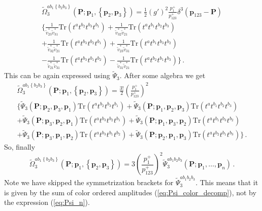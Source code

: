 \documentclass[english,american]{article}
\begin{document}
\begin{multline}
\tilde{\Omega}_{3}^{ab_{1}\left\{ b_{2}b_{3}\right\} }\left(\mathbf{P};\mathbf{p}_{1},\left\{ \mathbf{p}_{2},\mathbf{p}_{3}\right\} \right)=\frac{1}{2}\left(g'\right)^{2}\frac{p_{1}^{+}}{p_{123}^{+}}\delta^{3}\left(\mathbf{p}_{123}-\mathbf{P}\right)\\
\Bigg\{\frac{1}{\tilde{v}_{23}^{*}\tilde{v}_{31}^{*}}\mathrm{Tr}\left(t^{a}t^{b_{2}}t^{b_{3}}t^{b_{1}}\right)+\frac{1}{\tilde{v}_{32}^{*}\tilde{v}_{21}^{*}}\mathrm{Tr}\left(t^{a}t^{b_{1}}t^{b_{2}}t^{b_{3}}\right)\\
+\frac{1}{\tilde{v}_{32}^{*}\tilde{v}_{21}^{*}}\mathrm{Tr}\left(t^{a}t^{b_{3}}t^{b_{2}}t^{b_{1}}\right)+\frac{1}{\tilde{v}_{23}^{*}\tilde{v}_{31}^{*}}\mathrm{Tr}\left(t^{a}t^{b_{1}}t^{b_{3}}t^{b_{2}}\right)\\
-\frac{1}{\tilde{v}_{21}^{*}\tilde{v}_{31}^{*}}\mathrm{Tr}\left(t^{a}t^{b_{3}}t^{b_{1}}t^{b_{2}}\right)-\frac{1}{\tilde{v}_{31}^{*}\tilde{v}_{21}^{*}}\mathrm{Tr}\left(t^{a}t^{b_{2}}t^{b_{1}}t^{b_{3}}\right)\Bigg\}\,.
\end{multline}
This can be again expressed using $\tilde{\Psi}_{3}$. After some
algebra we get
\begin{multline}
\tilde{\Omega}_{3}^{ab_{1}\left\{ b_{2}b_{3}\right\} }\left(\mathbf{P};\mathbf{p}_{1},\left\{ \mathbf{p}_{2},\mathbf{p}_{3}\right\} \right)=\frac{3!}{2}\left(\frac{p_{1}^{+}}{p_{123}^{+}}\right)^{2}\\
\Bigg\{\tilde{\Psi}_{3}\left(\mathbf{P};\mathbf{p}_{2},\mathbf{p}_{3},\mathbf{p}_{1}\right)\mathrm{Tr}\left(t^{a}t^{b_{2}}t^{b_{3}}t^{b_{1}}\right)+\tilde{\Psi}_{3}\left(\mathbf{P};\mathbf{p}_{1},\mathbf{p}_{2},\mathbf{p}_{3}\right)\mathrm{Tr}\left(t^{a}t^{b_{1}}t^{b_{2}}t^{b_{3}}\right)\\
+\tilde{\Psi}_{3}\left(\mathbf{P};\mathbf{p}_{3},\mathbf{p}_{2},\mathbf{p}_{1}\right)\mathrm{Tr}\left(t^{a}t^{b_{3}}t^{b_{2}}t^{b_{1}}\right)+\tilde{\Psi}_{3}\left(\mathbf{P};\mathbf{p}_{1},\mathbf{p}_{3},\mathbf{p}_{2}\right)\mathrm{Tr}\left(t^{a}t^{b_{1}}t^{b_{3}}t^{b_{2}}\right)\\
+\tilde{\Psi}_{3}\left(\mathbf{P};\mathbf{p}_{3},\mathbf{p}_{1},\mathbf{p}_{2}\right)\mathrm{Tr}\left(t^{a}t^{b_{3}}t^{b_{1}}t^{b_{2}}\right)+\tilde{\Psi}_{3}\left(\mathbf{P};\mathbf{p}_{2},\mathbf{p}_{1},\mathbf{p}_{3}\right)\mathrm{Tr}\left(t^{a}t^{b_{2}}t^{b_{1}}t^{b_{3}}\right)\Bigg\}\,.
\end{multline}
So, finally
\begin{equation}
\tilde{\Omega}_{3}^{ab_{1}\left\{ b_{2}b_{3}\right\} }\left(\mathbf{P};\mathbf{p}_{1},\left\{ \mathbf{p}_{2},\mathbf{p}_{3}\right\} \right)=3\left(\frac{p_{1}^{+}}{p_{123}^{+}}\right)^{2}\tilde{\Psi}_{3}^{ab_{1}b_{2}b_{3}}\left(\mathbf{P};\mathbf{p}_{1},\dots,\mathbf{p}_{n}\right)\,.
\end{equation}
Note we have skipped the symmetrization brackets for $\tilde{\Psi}_{3}^{ab_{1}b_{2}b_{3}}$.
This means that it is given by the sum of color ordered amplitudes (\ref{eq:Psi_color_decomp}),
not by the expression (\ref{eq:Psi_n}).
\end{document}
